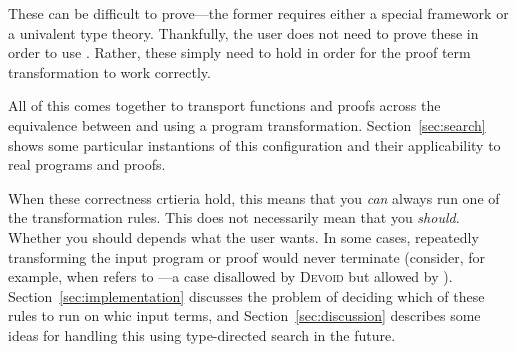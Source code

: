 These can be difficult to prove---the former requires either a special framework %
or a univalent type theory.
Thankfully, the user does not need to prove these in order to use \toolname.
Rather, these simply need to hold in order for the proof term transformation to work correctly.

All of this comes together to transport functions and proofs across the equivalence between \A and \B
using a program transformation.
Section~\ref{sec:search} shows some particular instantions of this configuration and their applicability to real programs and proofs.

When these correctness crtieria hold, this means that you \textit{can} always run one of the transformation rules.
This does not necessarily mean that you \textit{should}.
Whether you should depends what the user wants.
In some cases, repeatedly transforming the input program or proof would never terminate
(consider, for example, when \B refers to \A---a case disallowed by \textsc{Devoid} but allowed by \toolname).
Section~\ref{sec:implementation} discusses the problem of deciding which of these rules to run
on whic input terms, and Section~\ref{sec:discussion} describes some ideas
for handling this using type-directed search in the future.






